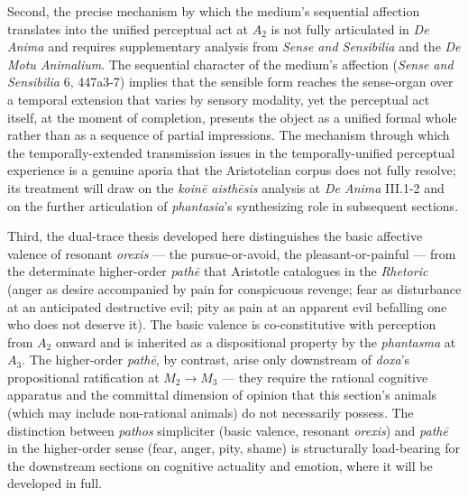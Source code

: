 \documentclass[12pt]{article}
\begin{document}
{Second, the precise mechanism by which the medium's sequential affection translates into the unified perceptual act at $A_2$ is not fully articulated in \textit{De Anima} and requires supplementary analysis from \textit{Sense and Sensibilia} and the \textit{De Motu Animalium}. The sequential character of the medium's affection (\textit{Sense and Sensibilia} 6, 447a3-7) implies that the sensible form reaches the sense-organ over a temporal extension that varies by sensory modality, yet the perceptual act itself, at the moment of completion, presents the object as a unified formal whole rather than as a sequence of partial impressions. The mechanism through which the temporally-extended transmission issues in the temporally-unified perceptual experience is a genuine aporia that the Aristotelian corpus does not fully resolve; its treatment will draw on the \textit{koinē aisthēsis} analysis at \textit{De Anima} III.1-2 and on the further articulation of \textit{phantasia}'s synthesizing role in subsequent sections.

Third, the dual-trace thesis developed here distinguishes the basic affective valence of resonant \textit{orexis} --- the pursue-or-avoid, the pleasant-or-painful --- from the determinate higher-order \textit{pathē} that Aristotle catalogues in the \textit{Rhetoric} (anger as desire accompanied by pain for conspicuous revenge; fear as disturbance at an anticipated destructive evil; pity as pain at an apparent evil befalling one who does not deserve it). The basic valence is co-constitutive with perception from $A_2$ onward and is inherited as a dispositional property by the \textit{phantasma} at $A_3$. The higher-order \textit{pathē}, by contrast, arise only downstream of \textit{doxa}'s propositional ratification at $M_2$$\to$$M_3$ --- they require the rational cognitive apparatus and the committal dimension of opinion that this section's animals (which may include non-rational animals) do not necessarily possess. The distinction between \textit{pathos} simpliciter (basic valence, resonant \textit{orexis}) and \textit{pathē} in the higher-order sense (fear, anger, pity, shame) is structurally load-bearing for the downstream sections on cognitive actuality and emotion, where it will be developed in full.}
\end{document}
